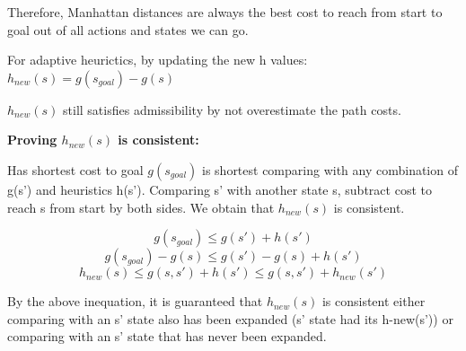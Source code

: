 \documentclass{article}
\begin{document}
\begin{enumerate}
\begin{enumerate}
            Therefore, Manhattan distances are always the best cost to reach from start to goal out of all actions and states we can go.

            For adaptive heurictics, by updating the new h values: 
            $h_{new}(s) = g(s_{goal}) - g(s)$ \par

            $h_{new}(s)$ still satisfies admissibility by not overestimate the path costs.

            \textbf{Proving $h_{new}(s)$ is consistent:} \par
            Has shortest cost to goal $g(s_{goal})$ is shortest comparing with any combination of g(s') and heuristics h(s'). Comparing s' with another state s, subtract cost to reach s from start by both sides. We obtain that $h_{new}(s)$ is consistent.
            
            \[g(s_{goal}) \leq g(s') + h(s') \] 
            \[g(s_{goal}) - g(s) \leq g(s') - g(s) + h(s') \] 
            \[h_{new}(s) \leq g(s,s') + h(s') \leq g(s,s') + h_{new}(s') \]         

            By the above inequation, it is guaranteed that $h_{new}(s)$ is consistent either comparing with an s' state also has been expanded (s' state had its h-new(s')) or comparing with an s' state that has never been expanded.
                
            
        \end{enumerate}
    \end{enumerate}
\end{document}
